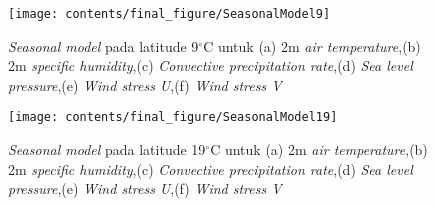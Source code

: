 \begin{figure}[H]
	\centering
	\texttt{[image: contents/final\_figure/SeasonalModel9]}
	\caption{\textit{Seasonal model} pada latitude 9$^\circ$C untuk (a) 2m \textit{air temperature},(b) 2m \textit{specific humidity},(c) \textit{Convective precipitation rate},(d) \textit{Sea level pressure},(e) \textit{Wind stress U},(f) \textit{Wind stress V}}
	\label{fig:SM9}
\end{figure}

\begin{figure}[H]
	\centering
	\texttt{[image: contents/final\_figure/SeasonalModel19]}
	\caption{\textit{Seasonal model} pada latitude 19$^\circ$C untuk (a) 2m \textit{air temperature},(b) 2m \textit{specific humidity},(c) \textit{Convective precipitation rate},(d) \textit{Sea level pressure},(e) \textit{Wind stress U},(f) \textit{Wind stress V}}
	\label{fig:SM19}
\end{figure}